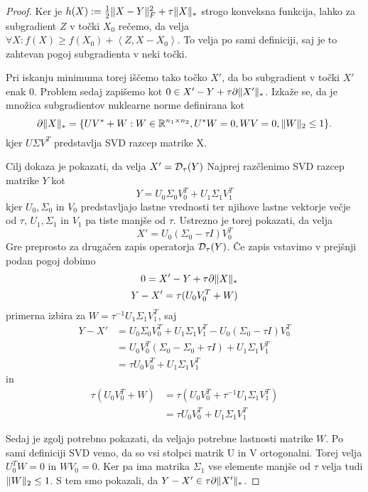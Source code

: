 \begin{proof} 
Ker je $h(X) := \frac{1}{2} \lVert X-Y\rVert_F^2 + \tau\lVert X\rVert_* $ strogo konveksna funkcija, lahko za subgradient $Z$ v točki $X_0$ rečemo, da velja $\forall X: f(X) \geq  f(X_0) + \left< Z, X - X_0 \right>$.  To velja po sami definiciji, saj je to zahtevan pogoj subgradienta v neki točki.

Pri iskanju minimuma torej iščemo tako točko $X'$, da bo subgradient v točki $X'$ enak 0. Problem sedaj zapišemo kot $0 \in X' - Y + \tau \partial\lVert X'\rVert_*$. Izkaže se, da je množica subgradientov nuklearne norme definirana kot
\[
    \partial\lVert X\rVert_* = \{UV^* + W: W \in \mathbb{R}^{n_1 \times n_2}, U^*W = 0, WV = 0, \lVert W\rVert_2 \leq 1 \}.
\]
kjer $U \Sigma V^T$ predstavlja SVD razcep matrike X. \cite{CCS}

Cilj dokaza je pokazati, da velja $X' = \mathcal{D}_\tau(Y)$ Najprej razčlenimo SVD razcep matrike $Y$ kot 
\[
    Y = U_0\Sigma_0V_0^T + U_1\Sigma_1V_1^T
\]
kjer $U_0, \Sigma_0$ in $V_0$ predstavljajo lastne vrednosti ter njihove lastne vektorje večje od $\tau$, $U_1, \Sigma_1$ in $V_1$ pa tiste manjše od $\tau$. Ustrezno je torej pokazati, da velja 
\[
    X' = U_0(\Sigma_0 - \tau I)V_0^T
\] Gre preprosto za drugačen zapis operatorja $\mathcal{D}_\tau(Y)$.
Če zapis vstavimo v prejšnji podan pogoj dobimo
\begin{align*}
    0 = X' - Y + \tau \partial \lVert X\rVert_*\\
    Y- X' = \tau (U_0 V_0^T + W)
\end{align*}
primerna izbira za $W = \tau^{-1} U_1 \Sigma_1 V_1^T$, saj
\begin{align*}
    Y-X' &= U_0\Sigma_0V_0^T + U_1\Sigma_1V_1^T - U_0(\Sigma_0 - \tau I)V_0^T \\ 
    &= U_0V_0^T(\Sigma_0 - \Sigma_0 + \tau I) + U_1\Sigma_1 V_1^T  \\
    &= \tau U_0 V_0^T + U_1\Sigma_1 V_1^T
\end{align*}
in 
\begin{align*}
    \tau(U_0 V_0^T + W) &= \tau(U_0V_0^T + \tau^{-1} U_1 \Sigma_1 V_1^T)\\ 
    &= \tau U_0 V_0^T + U_1 \Sigma_1 V_1^T 
\end{align*}

Sedaj je zgolj potrebno pokazati, da veljajo potrebne lastnosti matrike $W$.
Po sami definiciji SVD vemo, da so vsi stolpci matrik U in V ortogonalni. Torej velja $U_0^TW = 0$ in $WV_0 = 0$. Ker pa ima matrika $\Sigma_1$ vse elemente manjše od $\tau$ velja tudi $\lVert W\rVert_2 \leq 1$. S tem smo pokazali, da $Y - X' \in \tau \partial \lVert X'\rVert_*$.
\end{proof}

